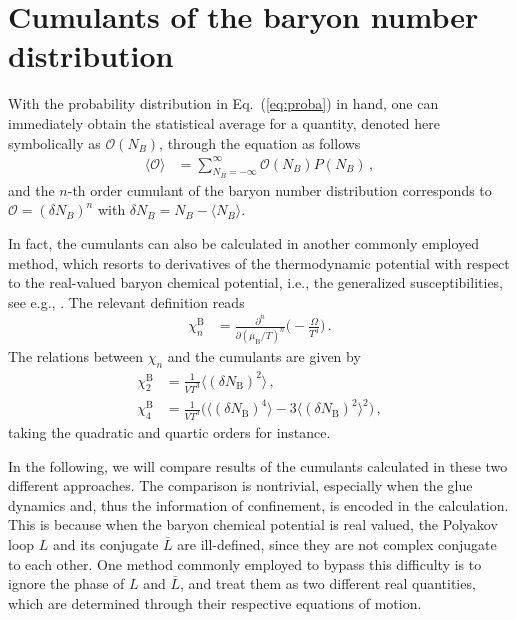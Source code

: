\documentclass[%
reprint,
superscriptaddress,
showpacs,preprintnumbers,
 amsmath,amssymb,
 aps,
prd,
]{revtex4-1}
\def\Eq#1{Eq.~(\ref{#1})}
\begin{document}
\section{Cumulants of the baryon number distribution}
\label{sec:cumulant}

With the probability distribution in \Eq{eq:proba} in hand, one can immediately obtain the statistical average for a quantity, denoted here symbolically as $\mathcal{O}(N_B)$, through the equation as follows
\begin{align}
  \langle\mathcal{O}\rangle&=\sum_{N_B=-\infty}^{\infty}\mathcal{O}(N_B)P(N_B)\,,\label{eq:Oaver}
\end{align}
and the $n$-th order cumulant of the baryon number distribution corresponds to $\mathcal{O}=(\delta N_B)^n$ with $\delta N_B=N_B-\langle N_B\rangle$. 

In fact, the cumulants can also be calculated in another commonly employed method, which resorts to derivatives of the thermodynamic potential with respect to the real-valued baryon chemical potential, i.e., the generalized susceptibilities, see e.g., \cite{Fu:2015naa}. The relevant definition reads
\begin{align}
   \chi_n^{\mathrm{B}}&=\frac{\partial^n}{\partial (\mu_{\mathrm{B}}/T)^n}\bigg(-\frac{\Omega}{T^4}\bigg)\,.\label{eq:suscep}
\end{align}
The relations between $\chi_n$ and the cumulants are given by
\begin{align}
  \chi_2^{\mathrm{B}}&=\frac{1}{VT^3}\langle(\delta N_{\mathrm{B}})^2\rangle\,,\nonumber\\[2ex]
  \chi_4^{\mathrm{B}}&=\frac{1}{VT^3}\Big(\langle(\delta N_{\mathrm{B}})^4\rangle-3\langle(\delta N_{\mathrm{B}})^2\rangle^2\Big)\,,
\end{align}
taking the quadratic and quartic orders for instance.

In the following, we will compare results of the cumulants calculated in these two different approaches. The comparison is nontrivial, especially when the glue dynamics and, thus the information of confinement, is encoded in the calculation. This is because when the baryon chemical potential is real valued, the Polyakov loop $L$ and its conjugate $\bar L$ are ill-defined, since they are not complex conjugate to each other. One method commonly employed to bypass this difficulty is to ignore the phase of  $L$ and $\bar L$, and treat them as two different real quantities, which are determined through their respective equations of motion. 
\end{document}
